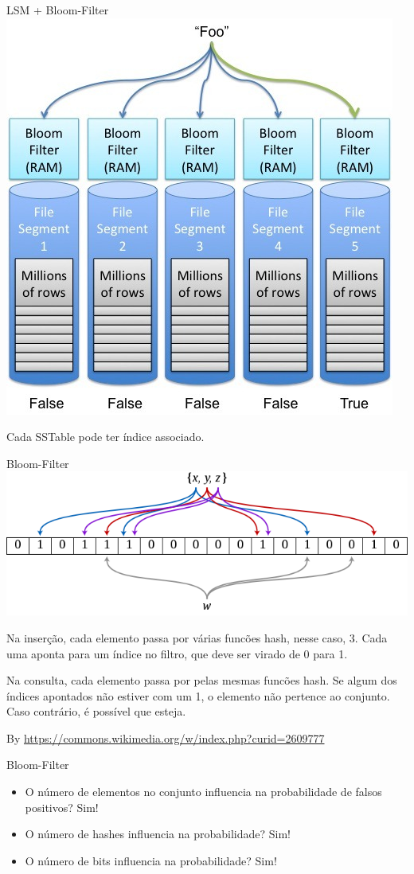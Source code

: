 \begin{frame}{LSM + Bloom-Filter}
\includegraphics[width=.6\textwidth]{./images/bf_lsm.jpg}

Cada SSTable pode ter índice associado.
\end{frame}

\begin{frame}{Bloom-Filter}
\includegraphics[width=.7\textwidth]{./images/bloom.png}

Na \alert{inserção}, cada elemento passa por várias funcões hash, nesse caso, 3. Cada uma aponta para um índice no filtro, que deve ser virado de 0 para 1.

Na \alert{consulta}, cada elemento passa por pelas mesmas funcões hash. Se algum dos índices apontados não estiver com um 1, o elemento não pertence ao conjunto. Caso contrário, é possível que esteja.

By \href{David Eppstein}{https://commons.wikimedia.org/w/index.php?curid=2609777}
\end{frame}


\begin{frame}{Bloom-Filter}
\begin{itemize}
	\item O número de elementos no conjunto influencia na probabilidade de falsos positivos? \pause Sim!
	\item O número de hashes influencia na probabilidade? \pause Sim!
	\item O número de bits influencia na probabilidade? \pause Sim!
\end{itemize}
\end{frame}

